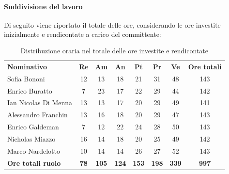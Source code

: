 \documentclass[../piano-di-progetto.tex]{subfiles}
\begin{document}
  \paragraph{Suddivisione del lavoro}
  Di seguito viene riportato il totale delle ore, considerando le ore investite inizialmente e rendicontate a carico del committente:
  \begin{table}[H]
    \centering
    \begin{tabular}{lccccccc}
      \rowcolor{lightgray}
\textbf{Nominativo}       & \textbf{Re} & \textbf{Am}  & \textbf{An}  & \textbf{Pt}  & \textbf{Pr}  & \textbf{Ve}  & \textbf{Ore totali} \\
Sofia Bononi              & 12          & 13           & 18           & 21           & 31           & 48           & 143                 \\
Enrico Buratto            & 7           & 23           & 17           & 22           & 29           & 44           & 142                 \\
Ian Nicolas Di Menna      & 13          & 13           & 17           & 20           & 29           & 49           & 141                 \\
Alessandro Franchin       & 13          & 16           & 18           & 20           & 29           & 47           & 143                 \\
Enrico Galdeman           & 7           & 12           & 22           & 24           & 28           & 50           & 143                 \\
Nicholas Miazzo           & 16          & 14           & 18           & 20           & 25           & 49           & 142                 \\
Marco Nardelotto          & 10          & 14           & 14           & 26           & 27           & 52           & 143                 \\
\textbf{Ore totali ruolo} & \textbf{78} & \textbf{105} & \textbf{124} & \textbf{153} & \textbf{198} & \textbf{339} & \textbf{997}       

    \end{tabular}
    \caption{Distribuzione oraria nel totale delle ore investite e rendicontate}
    \end{table}
\end{document}
